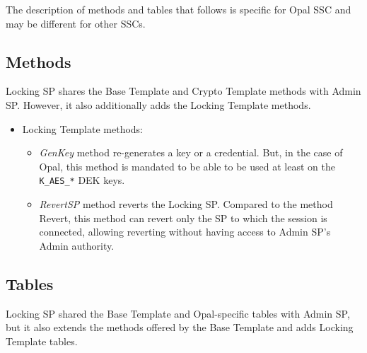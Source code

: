 The description of methods and tables that follows is specific for Opal SSC and may be different for other SSCs.




\subsection{Methods}

Locking SP shares the Base Template and Crypto Template methods with Admin SP. However, it also additionally adds the Locking Template methods.

\newpage


\begin{itemize}
\item Locking Template methods:
\begin{itemize}
\item \emph{GenKey} method re-generates a key or a credential. But, in the case of Opal, this method is mandated to be able to be used at least on the \verb|K_AES_*| DEK keys.
\item \emph{RevertSP} method reverts the Locking SP. Compared to the method Revert, this method can revert only the SP to which the session is connected, allowing reverting without having access to Admin SP's Admin authority.
\end{itemize}
\end{itemize}

\subsection{Tables}
\label{locking_sp_tables}

Locking SP shared the Base Template and Opal-specific tables with Admin SP, but it also extends the methods offered by the Base Template and adds Locking Template tables.

